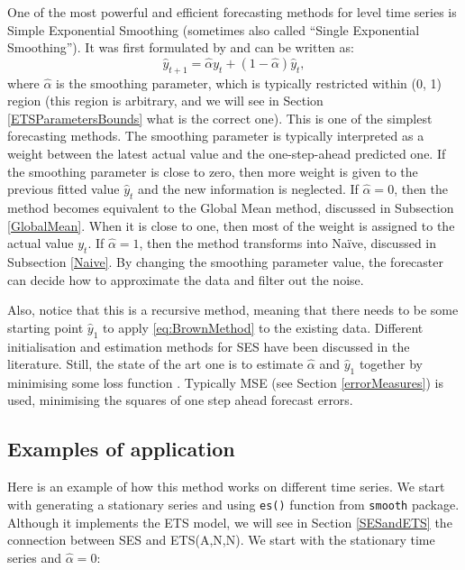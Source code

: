 \documentclass[]{book}
\theoremstyle{definition}
\theoremstyle{definition}
\theoremstyle{definition}
\theoremstyle{definition}
\theoremstyle{remark}
\begin{document}
One of the most powerful and efficient forecasting methods for level time series \citep[which is also very popular in practice according to][]{LCFweller2012} is Simple Exponential Smoothing (sometimes also called ``Single Exponential Smoothing''). It was first formulated by \citet{Brown1956} and can be written as:
\begin{equation}
  \hat{y}_{t+1} = \hat{\alpha} {y}_{t} + (1 -\hat{\alpha}) \hat{y}_{t},
  \label{eq:BrownMethod}
\end{equation}
where \(\hat{\alpha}\) is the smoothing parameter, which is typically restricted within (0, 1) region (this region is arbitrary, and we will see in Section \ref{ETSParametersBounds} what is the correct one). This is one of the simplest forecasting methods. The smoothing parameter is typically interpreted as a weight between the latest actual value and the one-step-ahead predicted one. If the smoothing parameter is close to zero, then more weight is given to the previous fitted value \(\hat{y}_{t}\) and the new information is neglected. If \(\hat{\alpha}=0\), then the method becomes equivalent to the Global Mean method, discussed in Subsection \ref{GlobalMean}. When it is close to one, then most of the weight is assigned to the actual value \({y}_{t}\). If \(\hat{\alpha}=1\), then the method transforms into Naïve, discussed in Subsection \ref{Naive}. By changing the smoothing parameter value, the forecaster can decide how to approximate the data and filter out the noise.

Also, notice that this is a recursive method, meaning that there needs to be some starting point \(\hat{y}_1\) to apply \eqref{eq:BrownMethod} to the existing data. Different initialisation and estimation methods for SES have been discussed in the literature. Still, the state of the art one is to estimate \(\hat{\alpha}\) and \(\hat{y}_{1}\) together by minimising some loss function \citep{Hyndman2002}. Typically MSE (see Section \ref{errorMeasures}) is used, minimising the squares of one step ahead forecast errors.

\hypertarget{examples-of-application}{%
\subsection{Examples of application}\label{examples-of-application}}

Here is an example of how this method works on different time series. We start with generating a stationary series and using \texttt{es()} function from \texttt{smooth} package. Although it implements the ETS model, we will see in Section \ref{SESandETS} the connection between SES and ETS(A,N,N). We start with the stationary time series and \(\hat{\alpha}=0\):
\end{document}
